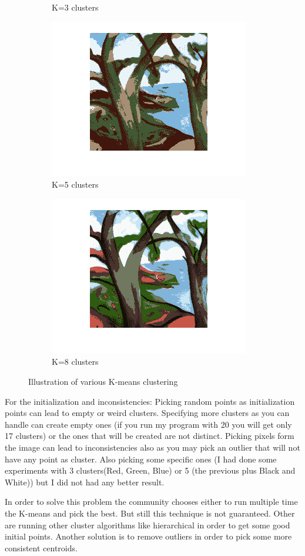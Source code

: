 \begin{figure}[ht]
\begin{subfigure}[b]{0.5\linewidth}
    \caption{K=3 clusters}
    \vspace{4ex}
  \end{subfigure} 
  \begin{subfigure}[b]{0.5\linewidth}
    \centering
    \includegraphics[width=0.75\linewidth]{figures/kmeans5.png}
    \caption{K=5 clusters} 
  \end{subfigure}%
  \begin{subfigure}[b]{0.5\linewidth}
    \centering
    \includegraphics[width=0.75\linewidth]{figures/kmeans8.png} 
    \caption{K=8 clusters} 
  \end{subfigure} 
  \caption{Illustration of various K-means clustering}
\end{figure}

For the initialization and inconsistencies:
Picking random points as initialization points can lead to empty or weird clusters. Specifying
more clusters as you can handle can create empty ones (if you run my program with 20 you will get
only 17 clusters) or the ones that will be created are not distinct. Picking pixels form the image
can lead to inconsistencies also as you may pick an outlier that will not have any point as cluster.
Also picking some specific ones (I had done some experiments with 3 clusters(Red, Green, Blue) or 5
(the previous plus Black and White)) but I did not had any better result. 

In order to solve this problem the community chooses either to run multiple time the K-means and
pick the best. But still this technique is not guaranteed. Other are running other cluster algorithms
like hierarchical in order to get some good initial points. Another solution is to remove outliers
in order to pick some more consistent centroids.
